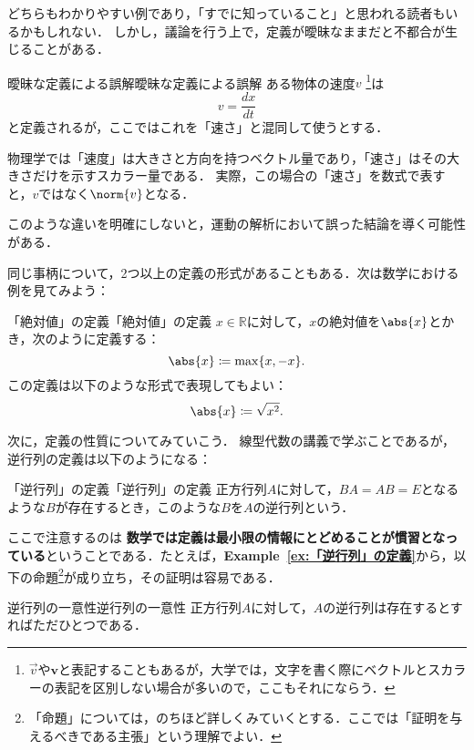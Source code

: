 \documentclass[a4paper,11pt]{ltjsarticle}
\renewcommand{\emph}[1]{\textbf{#1}}
\newcommand{\exref}[1]{\textsf{\bfseries Example~\ref{ex:#1}}}
\begin{document}
どちらもわかりやすい例であり，「すでに知っていること」と思われる読者もいるかもしれない．
しかし，議論を行う上で，定義が曖昧なままだと不都合が生じることがある．

\begin{example}{曖昧な定義による誤解}{曖昧な定義による誤解}
  ある物体の速度$v$ \footnote{$\vec{v}$や$\bm{v}$と表記することもあるが，大学では，文字を書く際にベクトルとスカラーの表記を区別しない場合が多いので，ここもそれにならう．}は
  \[
    v = \frac{dx}{dt}
  \]
  と定義されるが，ここではこれを「速さ」と混同して使うとする．

  物理学では「速度」は大きさと方向を持つベクトル量であり，「速さ」はその大きさだけを示すスカラー量である．
  実際，この場合の「速さ」を数式で表すと，$v$ではなく$\norm{v}$となる．

  このような違いを明確にしないと，運動の解析において誤った結論を導く可能性がある．
\end{example}

同じ事柄について，2つ以上の定義の形式があることもある．次は数学における例を見てみよう：

\begin{example}{「絶対値」の定義}{「絶対値」の定義}
  $ x \in \mathbb{R}$に対して，$x$の絶対値を$\abs{x}$とかき，次のように定義する：
  \[
    \abs{x} \coloneqq \max \{ x , -x \} .
  \]
  この定義は以下のような形式で表現してもよい：
  \[
    \abs{x} \coloneqq  \sqrt{x^2}.
  \]
\end{example}

次に，定義の性質についてみていこう．
線型代数の講義で学ぶことであるが，逆行列の定義は以下のようになる：

\begin{example}{「逆行列」の定義}{「逆行列」の定義}
  正方行列$A$に対して，$BA = AB =E$となるような$B$が存在するとき，このような$B$を$A$の逆行列という．
\end{example}


ここで注意するのは \emph{数学では定義は最小限の情報にとどめることが慣習となっている}ということである．たとえば，\exref{「逆行列」の定義}から，以下の命題\footnote{「命題」については，のちほど詳しくみていくとする．ここでは「証明を与えるべきである主張」という理解でよい．}が成り立ち，その証明は容易である．

\begin{prop}{逆行列の一意性}{逆行列の一意性}
  正方行列$A$に対して，$A$の逆行列は存在するとすればただひとつである．
\end{prop}
\end{document}
